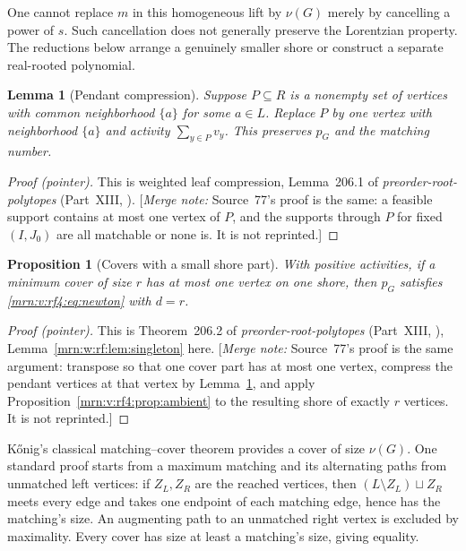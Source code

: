 \documentclass[11pt,a4paper]{article}
\newtheorem{lemma}[theorem]{Lemma}
\newtheorem{proposition}[theorem]{Proposition}
\theoremstyle{remark}\newtheorem{remark}[theorem]{Remark}
\newcommand{\mnote}[1]{[\textit{Merge note:} #1]}
\newcommand{\prp}{\emph{preorder-root-polytopes}}
\begin{document}
One cannot replace $m$ in this homogeneous lift by $\nu(G)$ merely by cancelling a power of $s$. Such cancellation does not generally preserve the Lorentzian property. The reductions below arrange a genuinely smaller shore or construct a separate real-rooted polynomial.

\begin{lemma}[Pendant compression]\label{mrn:v:rf4:lem:pendant}
Suppose $P\subseteq R$ is a nonempty set of vertices with common neighborhood $\{a\}$ for some $a\in L$. Replace $P$ by one vertex with neighborhood $\{a\}$ and activity $\sum_{y\in P}v_y$. This preserves $p_G$ and the matching number.
\end{lemma}
\begin{proof}[Proof (pointer)]
This is weighted leaf compression, Lemma~206.1 of \prp{} (Part~XIII,
). \mnote{Source~77's proof is the same: a feasible
support contains at most one vertex of $P$, and the supports through $P$ for
fixed $(I,J_0)$ are all matchable or none is. It is not reprinted.}
\end{proof}


\begin{proposition}[Covers with a small shore part]\label{mrn:v:rf4:prop:thin}
With positive activities, if a minimum cover of size $r$ has at most one vertex on one shore, then $p_G$ satisfies \eqref{mrn:v:rf4:eq:newton} with $d=r$.
\end{proposition}
\begin{proof}[Proof (pointer)]
This is Theorem~206.2 of \prp{} (Part~XIII, ),
Lemma~\ref{mrn:w:rf:lem:singleton} here. \mnote{Source~77's proof is the same
argument: transpose so that one cover part has at most one vertex, compress the
pendant vertices at that vertex by Lemma~\ref{mrn:v:rf4:lem:pendant}, and apply
Proposition~\ref{mrn:v:rf4:prop:ambient} to the resulting shore of exactly $r$
vertices. It is not reprinted.}
\end{proof}


K\H{o}nig's classical matching--cover theorem provides a cover of size $\nu(G)$. One standard proof starts from a maximum matching and its alternating paths from unmatched left vertices: if $Z_L,Z_R$ are the reached vertices, then $(L\setminus Z_L)\sqcup Z_R$ meets every edge and takes one endpoint of each matching edge, hence has the matching's size. An augmenting path to an unmatched right vertex is excluded by maximality. Every cover has size at least a matching's size, giving equality.
\end{document}
